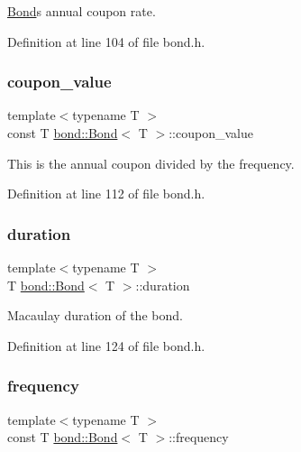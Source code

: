 \hyperlink{classbond_1_1_bond}{Bond}\textquotesingle{}s annual coupon rate. 



Definition at line 104 of file bond.\+h.

\mbox{\label{classbond_1_1_bond_aae68bdfac23a0530b3723cca3100e92e}} 
\subsubsection{\texorpdfstring{coupon\+\_\+value}{coupon\_value}}
{\footnotesize\ttfamily template$<$typename T $>$ \\
const T \hyperlink{classbond_1_1_bond}{bond\+::\+Bond}$<$ T $>$\+::coupon\+\_\+value\hspace{0.3cm}{\ttfamily [private]}}



This is the annual coupon divided by the frequency. 



Definition at line 112 of file bond.\+h.

\mbox{\label{classbond_1_1_bond_a76d054bdd6dcdefa0147495f8ecdc852}} 
\subsubsection{\texorpdfstring{duration}{duration}}
{\footnotesize\ttfamily template$<$typename T $>$ \\
T \hyperlink{classbond_1_1_bond}{bond\+::\+Bond}$<$ T $>$\+::duration\hspace{0.3cm}{\ttfamily [private]}}



Macaulay duration of the bond. 



Definition at line 124 of file bond.\+h.

\mbox{\label{classbond_1_1_bond_ad1871f40122a63fb0b2ebbdcdd12c1cd}} 
\subsubsection{\texorpdfstring{frequency}{frequency}}
{\footnotesize\ttfamily template$<$typename T $>$ \\
const T \hyperlink{classbond_1_1_bond}{bond\+::\+Bond}$<$ T $>$\+::frequency\hspace{0.3cm}{\ttfamily [private]}}



